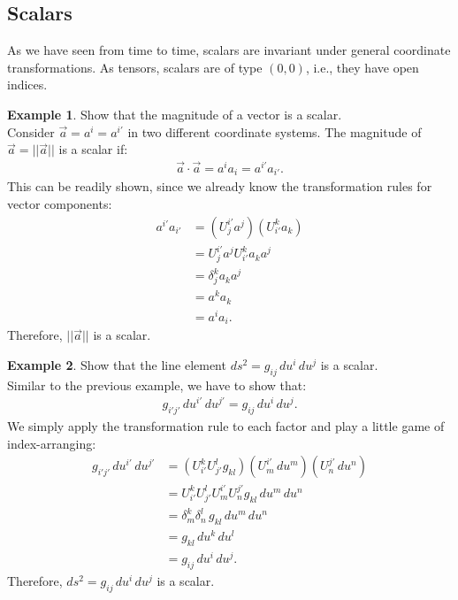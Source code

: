 \documentclass{article}
\theoremstyle{definition}
\newtheorem{exmp}{Example}[section]
\begin{document}
\subsection{Scalars}
As we have seen from time to time, scalars are invariant under general coordinate transformations. As tensors, scalars are of type $(0,0)$, i.e., they have open indices.
\begin{exmp}
	Show that the magnitude of a vector is a scalar.\\
	
	Consider $\vec{a} = {a^i} = {a^{i'}}$ in two different coordinate systems. The magnitude of $\vec{a} = \vert\vert \vec{a} \vert\vert$ is a scalar if:
	\begin{align*}
	\vec{a}\cdot\vec{a} = a^ia_i = a^{i'}a_{i'}.
	\end{align*} 
	This can be readily shown, since we already know the transformation rules for vector components:
	\begin{align*}
	a^{i'}a_{i'} &= \left( U^{i'}_j a^j \right) \left( U^{k}_{i'}a_k\right) \\
	&= U^{i'}_j a^j U^{k}_{i'} a_k a^j\\
	&= \delta^{k}_j a_k a^j\\
	&= a^k a_k\\
	&= a^i a_i.
	\end{align*}
	Therefore, $\vert\vert \vec{a} \vert\vert$ is a scalar.
\end{exmp}
\begin{exmp}
	Show that the line element $ds^2 = g_{ij}\,du^i\,du^j$ is a scalar. \\
	
	Similar to the previous example, we have to show that:
	\begin{align*}
	g_{i'j'}\,du^{i'}\,du^{j'} = g_{ij}\,du^i\,du^j.
	\end{align*}
	We simply apply the transformation rule to each factor and play a little game of index-arranging:
	\begin{align*}
	g_{i'j'}\,du^{i'}\,du^{j'} &= \left( U^k_{i'} U^l_{j'} g_{kl}\right) \left(U^{i'}_m \,du^m \right) \left(U^{j'}_n \,du^n\right) \\
	&= U^k_{i'} U^l_{j'} U^{i'}_m U^{j'}_n g_{kl}\,du^m\,du^n\\
	&= \delta^k_m\delta^l_n \,g_{kl}\,du^m\,du^n\\
	&= g_{kl}\,du^k\,du^l\\
	&= g_{ij}\,du^i\,du^j.
	\end{align*}
	Therefore, $ds^2 = g_{ij}\,du^i\,du^j$ is a scalar.
\end{exmp}
\end{document}
